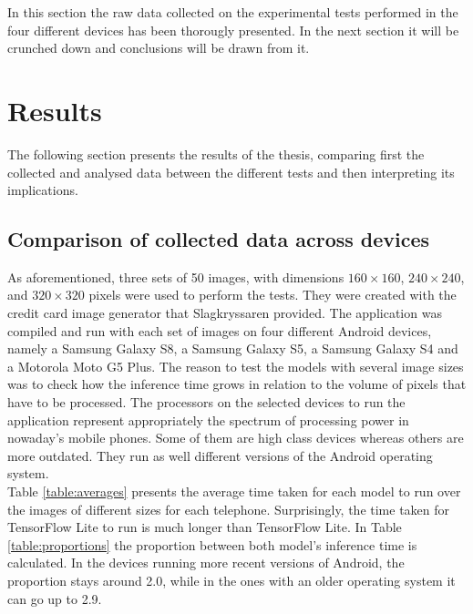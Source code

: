 In this section the raw data collected on the experimental tests performed in the four different devices has been thorougly presented. In the next section it will be crunched down and conclusions will be drawn from it. \\

\newpage
\section{Results}
The following section presents the results of the thesis, comparing first the collected and analysed data between the different tests and then interpreting its implications.
\subsection{Comparison of collected data across devices}
As aforementioned, three sets of 50 images, with dimensions $ 160\times160 $, $ 240\times240 $, and $ 320\times320 $ pixels were used to perform the tests. They were created with the credit card image generator that Slagkryssaren provided. The application was compiled and run with each set of images on four different Android devices, namely a Samsung Galaxy S8, a Samsung Galaxy S5, a Samsung Galaxy S4 and a Motorola Moto G5 Plus. The reason to test the models with several image sizes was to check how the inference time grows in relation to the volume of pixels that have to be processed. The processors on the selected devices to run the application represent appropriately the spectrum of processing power in nowaday's mobile phones. Some of them are high class devices whereas others are more outdated. They run as well different versions of the Android operating system. \\

Table \ref{table:averages} presents the average time taken for each model to run over the images of different sizes for each telephone. Surprisingly, the time taken for TensorFlow Lite to run is much longer than TensorFlow Lite. In Table \ref{table:proportions} the proportion between both model's inference time is calculated. In the devices running more recent versions of Android, the proportion stays around 2.0, while in the ones with an older operating system it can go up to 2.9. \\

